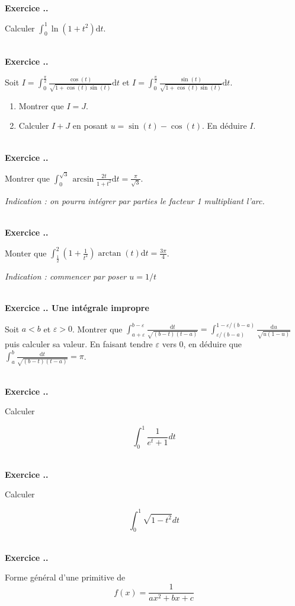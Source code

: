 \documentclass{article}
\newcommand{\di}{\mathrm{d}}
\newcounter{exo}
\newcommand{\exercice}[1][\null]{\textbf{\\ Exercice \thesection.\theexo. #1} \addtocounter{exo}{1}}
\begin{document}
\exercice

Calculer $\displaystyle \int_0^1 \ln(1+t^2) \di t$.


\exercice

Soit $\displaystyle I = \int_{0}^{\frac{\pi}{2}} \frac{\cos(t)}{\sqrt{1+ \cos(t) \sin(t)}} \di t$ et $\displaystyle I = \int_{0}^{\frac{\pi}{2}} \frac{\sin(t)}{\sqrt{1+ \cos(t) \sin(t)}} \di t$.

\begin{enumerate}

\item Montrer que $I = J$.

\item Calculer $I+J$ en posant $u = \sin(t) - \cos(t)$. En déduire $I$.

\end{enumerate}


\exercice
Montrer que $\displaystyle \int_{0}^{\sqrt{3}} \arcsin \frac{2t}{1+t^2} \di t = \frac{\pi}{\sqrt{3}}$.

\emph{Indication : on pourra intégrer par parties le facteur 1 multipliant l'arc.}


\exercice

Monter que $\displaystyle \int_{\frac{1}{2}}^2 \left(1+\frac{1}{t^2}\right) \arctan (t) \di t = \frac{3 \pi}{4}$.

\emph{Indication : commencer par poser $u = 1/t$}


\exercice[Une intégrale impropre]

Soit $a<b$ et $\varepsilon > 0$. Montrer que $\displaystyle \int_{a+ \varepsilon}^{b - \varepsilon} \frac{\di t}{\sqrt{(b-t)(t-a)}} = \int_{\varepsilon/(b-a)}^{1-\varepsilon/(b-a)} \frac{\di u}{\sqrt{u(1-u)}}$ puis calculer sa valeur. En faisant tendre $\varepsilon$ vers 0, en déduire que $\displaystyle \int_{a}^{b} \frac{\di t}{\sqrt{(b-t)(t-a)}}  = \pi$.

\exercice 

Calculer 

\begin{equation*}
    \int_0^1 \frac{1}{e^t + 1} dt 
\end{equation*}

\exercice 

Calculer 

\begin{equation*}
    \int_0^1 \sqrt{1 - t^2} dt 
\end{equation*}

\exercice 

Forme général d'une primitive de 
\begin{equation*}
    f(x) = \frac{1}{ax^2 + bx + c}
\end{equation*}
\end{document}
